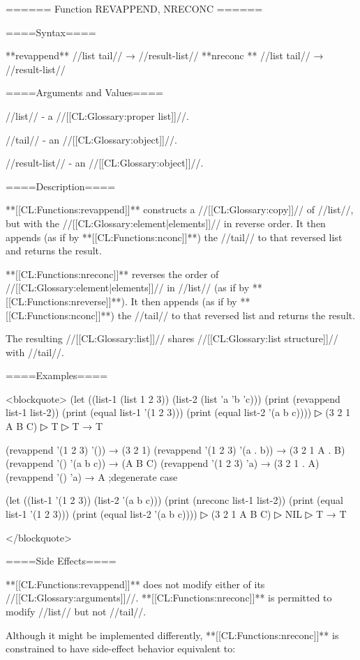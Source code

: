 ====== Function REVAPPEND, NRECONC ======

====Syntax====

**revappend** //list tail// → //result-list// **nreconc ** //list tail// → //result-list//

====Arguments and Values====

//list// - a //[[CL:Glossary:proper list]]//.

//tail// - an //[[CL:Glossary:object]]//.

//result-list// - an //[[CL:Glossary:object]]//.

====Description====

**[[CL:Functions:revappend]]** constructs a //[[CL:Glossary:copy]]// of //list//, but with the //[[CL:Glossary:element|elements]]// in reverse order. It then appends (as if by **[[CL:Functions:nconc]]**) the //tail// to that reversed list and returns the result.

**[[CL:Functions:nreconc]]** reverses the order of //[[CL:Glossary:element|elements]]// in //list// (as if by **[[CL:Functions:nreverse]]**). It then appends (as if by **[[CL:Functions:nconc]]**) the //tail// to that reversed list and returns the result.

The resulting //[[CL:Glossary:list]]// shares //[[CL:Glossary:list structure]]// with //tail//.

====Examples====

<blockquote> (let ((list-1 (list 1 2 3)) (list-2 (list 'a 'b 'c))) (print (revappend list-1 list-2)) (print (equal list-1 '(1 2 3))) (print (equal list-2 '(a b c))))
▷ (3 2 1 A B C)
▷ T
▷ T → T

(revappend '(1 2 3) '()) → (3 2 1) (revappend '(1 2 3) '(a . b)) → (3 2 1 A . B) (revappend '() '(a b c)) → (A B C) (revappend '(1 2 3) 'a) → (3 2 1 . A) (revappend '() 'a) → A ;degenerate case

(let ((list-1 '(1 2 3)) (list-2 '(a b c))) (print (nreconc list-1 list-2)) (print (equal list-1 '(1 2 3))) (print (equal list-2 '(a b c))))
▷ (3 2 1 A B C)
▷ NIL
▷ T → T

</blockquote>

====Side Effects====

**[[CL:Functions:revappend]]** does not modify either of its //[[CL:Glossary:arguments]]//. **[[CL:Functions:nreconc]]** is permitted to modify //list// but not //tail//.

Although it might be implemented differently, **[[CL:Functions:nreconc]]** is constrained to have side-effect behavior equivalent to:


